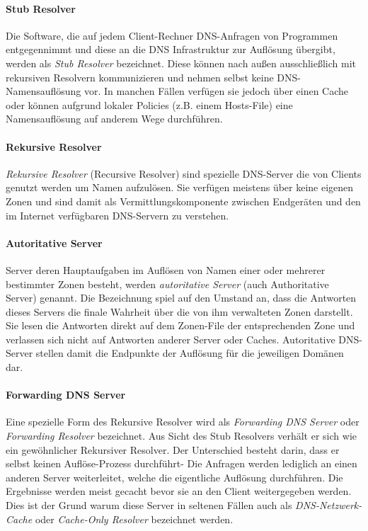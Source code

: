\paragraph{Stub Resolver}
Die Software, die auf jedem Client-Rechner DNS-Anfragen von Programmen entgegennimmt und diese an die DNS Infrastruktur zur Auflösung übergibt, werden als \textit{Stub Resolver} bezeichnet. Diese können nach außen ausschließlich mit rekursiven Resolvern kommunizieren und nehmen selbst keine DNS-Namensauflösung vor. In manchen Fällen verfügen sie jedoch über einen Cache oder können aufgrund lokaler Policies (z.B. einem Hosts-File) eine Namensauflösung auf anderem Wege durchführen.

\paragraph{Rekursive Resolver}
\textit{Rekursive Resolver} (Recursive Resolver) sind spezielle DNS-Server die von Clients genutzt werden um Namen aufzulösen. Sie verfügen meistens über keine eigenen Zonen und sind damit als Vermittlungskomponente zwischen Endgeräten und den im Internet verfügbaren DNS-Servern zu verstehen.

\paragraph{Autoritative Server}
Server deren Hauptaufgaben im Auflösen von Namen einer oder mehrerer bestimmter Zonen besteht, werden \textit{autoritative Server} (auch Authoritative Server) genannt. Die Bezeichnung spiel auf den Umstand an, dass die Antworten dieses Servers die finale Wahrheit über die von ihm verwalteten Zonen darstellt. Sie lesen die Antworten direkt auf dem Zonen-File der entsprechenden Zone und verlassen sich nicht auf Antworten anderer Server oder Caches. Autoritative DNS-Server stellen damit die Endpunkte der Auflösung für die jeweiligen Domänen dar.

\paragraph{Forwarding DNS Server}
Eine spezielle Form des Rekursive Resolver wird als \textit{Forwarding DNS Server} oder \textit{Forwarding Resolver} bezeichnet. Aus Sicht des Stub Resolvers verhält er sich wie ein gewöhnlicher Rekursiver Resolver. Der Unterschied besteht darin, dass er selbst keinen Auflöse-Prozess durchführt- Die Anfragen werden lediglich an einen anderen Server weiterleitet, welche die eigentliche Auflösung durchführen. Die Ergebnisse werden meist gecacht bevor sie an den Client weitergegeben werden. Dies ist der Grund warum diese Server in seltenen Fällen auch als \textit{DNS-Netzwerk-Cache} oder \textit{Cache-Only Resolver} bezeichnet werden. 

